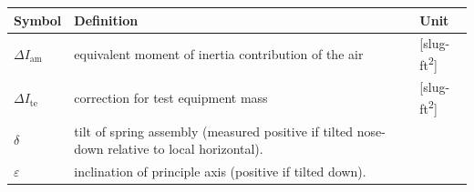 \documentclass[
]{book}
\begin{document}
\begin{longtable}[]{@{}lll@{}}
\toprule
\begin{minipage}[b]{0.14\columnwidth}\raggedright
Symbol\strut
\end{minipage} & \begin{minipage}[b]{0.68\columnwidth}\raggedright
Definition\strut
\end{minipage} & \begin{minipage}[b]{0.10\columnwidth}\raggedright
Unit\strut
\end{minipage}\tabularnewline
\midrule
\endhead
\begin{minipage}[t]{0.14\columnwidth}\raggedright
\(\Delta I_{\mathrm{am}}\)\strut
\end{minipage} & \begin{minipage}[t]{0.68\columnwidth}\raggedright
equivalent moment of inertia contribution of the air\strut
\end{minipage} & \begin{minipage}[t]{0.10\columnwidth}\raggedright
{[}slug-ft\textsuperscript{2}{]}\strut
\end{minipage}\tabularnewline
\begin{minipage}[t]{0.14\columnwidth}\raggedright
\(\Delta I_{\mathrm{te}}\)\strut
\end{minipage} & \begin{minipage}[t]{0.68\columnwidth}\raggedright
correction for test equipment mass\strut
\end{minipage} & \begin{minipage}[t]{0.10\columnwidth}\raggedright
{[}slug-ft\textsuperscript{2}{]}\strut
\end{minipage}\tabularnewline
\begin{minipage}[t]{0.14\columnwidth}\raggedright
\(\delta\)\strut
\end{minipage} & \begin{minipage}[t]{0.68\columnwidth}\raggedright
tilt of spring assembly (measured positive if tilted nose-down relative to local horizontal).\strut
\end{minipage} & \begin{minipage}[t]{0.10\columnwidth}\raggedright
\strut
\end{minipage}\tabularnewline
\begin{minipage}[t]{0.14\columnwidth}\raggedright
\(\varepsilon\)\strut
\end{minipage} & \begin{minipage}[t]{0.68\columnwidth}\raggedright
inclination of principle axis (positive if tilted down).\strut

\end{minipage}
\end{longtable}
\end{document}
